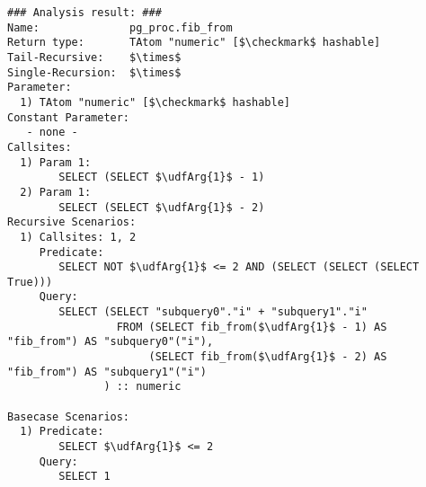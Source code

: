 \begin{lstlisting}[language={},basicstyle=\scriptsize]
### Analysis result: ###
Name:              pg_proc.fib_from
Return type:       TAtom "numeric" [$\checkmark$ hashable]
Tail-Recursive:    $\times$
Single-Recursion:  $\times$
Parameter:
  1) TAtom "numeric" [$\checkmark$ hashable]
Constant Parameter:
   - none -
Callsites:
  1) Param 1:
        SELECT (SELECT $\udfArg{1}$ - 1) 
  2) Param 1:
        SELECT (SELECT $\udfArg{1}$ - 2) 
Recursive Scenarios:
  1) Callsites: 1, 2
     Predicate:
        SELECT NOT $\udfArg{1}$ <= 2 AND (SELECT (SELECT (SELECT True)))
     Query:
        SELECT (SELECT "subquery0"."i" + "subquery1"."i" 
                 FROM (SELECT fib_from($\udfArg{1}$ - 1) AS "fib_from") AS "subquery0"("i"), 
                      (SELECT fib_from($\udfArg{1}$ - 2) AS "fib_from") AS "subquery1"("i")
               ) :: numeric

Basecase Scenarios:
  1) Predicate:
        SELECT $\udfArg{1}$ <= 2
     Query:
        SELECT 1
\end{lstlisting}
